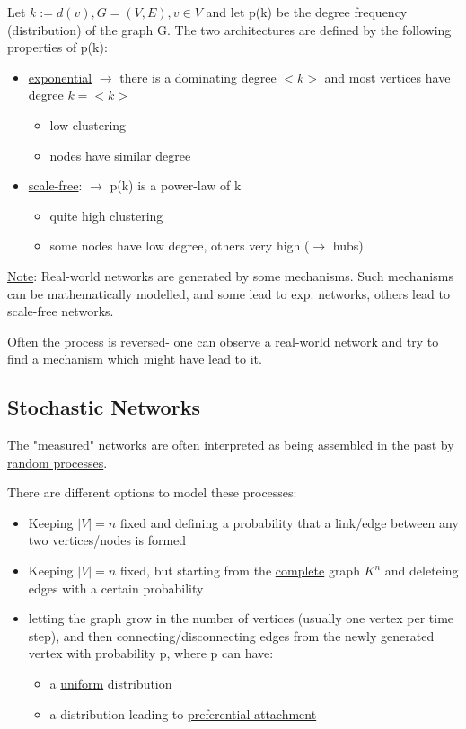 \documentclass[11pt]{book}
\begin{document}
Let $k:=d(v), G=(V,E), v \in V$ and let p(k) be the degree frequency (distribution) of the graph G. The two architectures are defined by the following properties of p(k):
\begin{itemize}
\item \underline{exponential} $\rightarrow$ there is a dominating degree $<k>$ and most vertices have degree $k=<k>$
\begin{itemize}
\item low clustering
\item nodes have similar degree
\end{itemize}
\item \underline{scale-free}: $\rightarrow$ p(k) is a power-law of k
\begin{itemize}
\item quite high clustering
\item some nodes have low degree, others very high ($\rightarrow$ hubs)
\end{itemize}
\end{itemize}

\vspace{5 cm}

\underline{Note}: Real-world networks are generated by some mechanisms. Such mechanisms can be mathematically modelled, and some lead to exp. networks, others lead to scale-free networks.

Often the process is reversed- one can observe a real-world network and try to find a mechanism which might have lead to it.\\

\subsection{Stochastic Networks}

The "measured" networks are often interpreted as being assembled in the past by \underline{random processes}.

There are different options to model these processes:
\begin{itemize}
\item Keeping $|V| =n$ fixed and defining a probability that a link/edge between any two vertices/nodes is formed
\item Keeping $|V|=n$ fixed, but starting from the \underline{complete} graph $K^{n}$ and deleteing edges with a certain probability
\item letting the graph grow in the number of vertices (usually one vertex per time step), and then connecting/disconnecting edges from the newly generated vertex with probability p, where p can have:
\begin{itemize}
\item a \underline{uniform} distribution
\item a distribution leading to \underline{preferential attachment}
\end{itemize}
\end{itemize}
\end{document}
